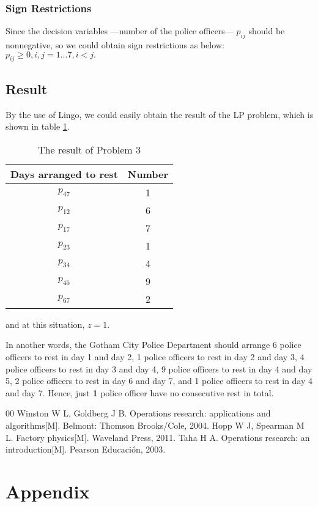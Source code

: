 \documentclass[12pt]{article}
\begin{document}
	\subsubsection{Sign Restrictions}
	Since the decision variables ---number of the police officers--- $p_{ij}$ should be nonnegative, so we could obtain sign restrictions as below:
	$p_{ij}\ge 0,i,j=1...7,i<j.$
	\subsection{Result}
	By the use of Lingo, we could easily obtain the result of the LP problem, which is shown in table \ref{tab11}.
	\begin{table}[H]
		\centering
		\setlength{\belowcaptionskip}{0.1cm}
		\caption{The result of Problem 3}
		\label{tab11}
		\begin{tabular}{cc}
			\hline
			\hline
			Days arranged to rest&Number\\
			\hline
			$p_{47}$& 1\\
			$p_{12}$& 6\\
			$p_{17}$& 7\\
			$p_{23}$& 1\\
			$p_{34}$& 4\\
			$p_{45}$& 9\\
			$p_{67}$& 2\\
			\hline
			\hline
		\end{tabular}
	\end{table}
\noindent and at this situation, $z=1$.

\noindent In another words, the Gotham City Police Department should arrange 6 police officers to rest in day 1 and day 2, 1 police officers to rest in day 2 and day 3, 4 police officers to rest in day 3 and day 4, 9 police officers to rest in day 4 and day 5, 2 police officers to rest in day 6 and day 7, and 1 police officers to rest in day 4 and day 7. Hence, just \textbf{1} police officer have no consecutive rest in total.


\begin{thebibliography}
{00}
Winston W L, Goldberg J B. Operations research: applications and algorithms[M]. Belmont: Thomson Brooks/Cole, 2004.
Hopp W J, Spearman M L. Factory physics[M]. Waveland Press, 2011.
Taha H A. Operations research: an introduction[M]. Pearson Educación, 2003.
\end{thebibliography}
\newpage

\section*{Appendix}
\appendix
\end{document}

